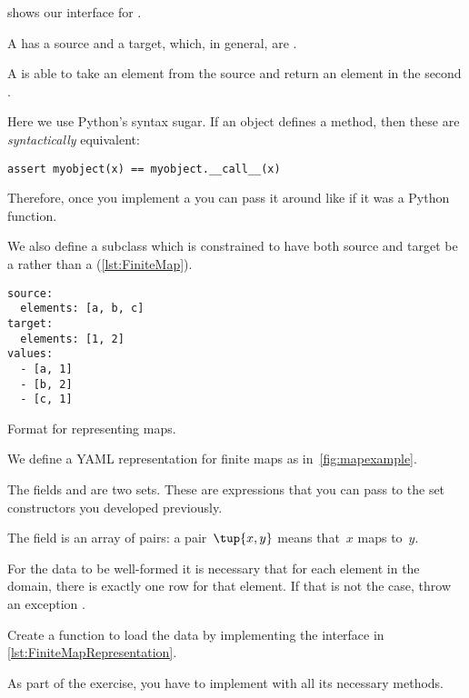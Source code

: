 
 shows our interface for \Mapping.


A \Mapping has a source and a target, which, in general, are .

A \Mapping is able to take an element from the source  and return an element in the second .

Here we use Python's syntax sugar.
If an object defines a  method, then these are \emph{syntactically} equivalent:

\begin{verbatim}
assert myobject(x) == myobject.__call__(x)
\end{verbatim}

Therefore, once you implement a \Mapping you can pass it around like if it was a Python function.

We also define a subclass \FiniteMap which is constrained to have both source and target be a \FiniteSet rather than a \Setoid (\cref{lst:FiniteMap}).

\begin{marginfigure}
    \begin{minipage}{4cm}
        \begin{verbatim}
source:
  elements: [a, b, c]
target:
  elements: [1, 2]
values:
  - [a, 1]
  - [b, 2]
  - [c, 1]
\end{verbatim}
    \end{minipage}
    \caption{Format for representing maps.}
    \label{fig:mapexample}
\end{marginfigure}


We define a YAML representation for finite maps as in~\cref{fig:mapexample}.

The fields  and  are two sets.
These are expressions that you can pass to the set constructors you developed previously.

The field  is an array of pairs: a pair~$\tup{x, y}$ means that~$x$ maps to~$y$.

For the data to be well-formed it is necessary that for each element in the domain, there is exactly one row for that element.
If that is not the case, throw an exception .


\begin{codeexercise}
    Create a function to load the data by implementing the interface in \cref{lst:FiniteMapRepresentation}.
\end{codeexercise}


As part of the exercise, you have to implement  with all its necessary methods.
